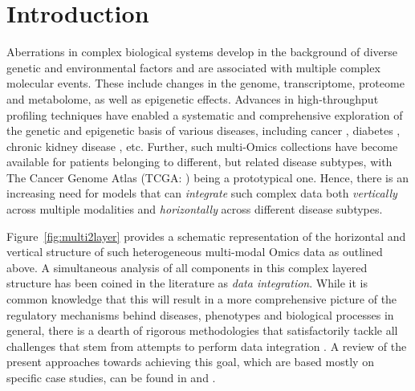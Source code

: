 \section{Introduction}

Aberrations in complex biological systems develop in the background of diverse genetic and environmental factors and are associated with multiple complex molecular events. These include changes in the genome, transcriptome, proteome and metabolome, as well as epigenetic effects. Advances in high-throughput profiling techniques have enabled a systematic and comprehensive exploration of the genetic and epigenetic basis of various diseases, including cancer \citep{lee2016integrated, kaushik2016inhibition}, diabetes \citep{yuan2014integrated,sas2018shared}, chronic kidney disease \citep{atzler2014integrated}, etc. Further, such multi-Omics collections have become available for patients belonging to different, but related disease subtypes, with The Cancer Genome Atlas (TCGA: \citet{Tomczak15}) being a prototypical one. Hence, there is an increasing need for models that can {\em integrate} such complex data both {\em vertically} across multiple modalities and {\em horizontally} across different disease subtypes.

Figure~\ref{fig:multi2layer} provides a schematic representation of the horizontal and vertical structure of such heterogeneous multi-modal Omics data as outlined above. A simultaneous analysis of all components in this complex layered structure has been coined in the literature as {\it data integration}. While it is common knowledge that this will result in a more comprehensive picture of the regulatory mechanisms behind diseases, phenotypes and biological processes in general, there is a dearth of rigorous methodologies that satisfactorily tackle all challenges that stem from attempts to perform data integration \citep{JoycePalsson06,GomezCabreroEtal14,GligPrzulj15}. A review of the present approaches towards achieving this goal, which are based mostly on specific case studies, can be found in \citet{GligPrzulj15} and \citet{ZhangOuyangZhao17}.

